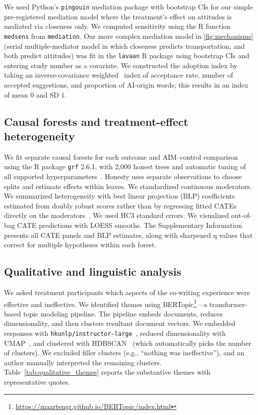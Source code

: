 \documentclass[11pt]{article}
\begin{document}
We used Python's \texttt{pingouin} mediation package with bootstrap CIs for our simple pre-registered mediation model where the treatment's effect on attitudes is mediated via closeness only. We computed sensitivity using the R function \texttt{medsens} from \texttt{mediation}. Our more complex mediation model in \autoref{fig:mechanisms} (serial multiple-mediator model in which closeness predicts transportation, and both predict attitudes) was fit in the \texttt{lavaan} R package using bootstrap CIs and entering study number as a covariate. We constructed the adoption index by taking an inverse-covariance weighted~\cite{anderson_multiple_2008} index of acceptance rate, number of accepted suggestions, and proportion of AI-origin words; this results in an index of mean 0 and SD 1.

\subsection{Causal forests and treatment-effect heterogeneity}
\label{sec:methods-causal-forests}
We fit separate causal forests for each outcome and AIM--control comparison using the R package \texttt{grf} 2.6.1, with 2,000 honest trees and automatic tuning of all supported hyperparameters~\citep{wager_estimation_2018,athey_estimating_2019}. Honesty uses separate observations to choose splits and estimate effects within leaves. We standardized continuous moderators.
We summarized heterogeneity with best linear projection (BLP) coefficients estimated from doubly robust scores rather than by regressing fitted CATEs directly on the moderators~\citep{semenova_debiased_2021,chernozhukov_doubledebiased_2018}. We used HC3 standard errors. We visualized out-of-bag CATE predictions with LOESS smooths. The Supplementary Information presents all CATE panels and BLP estimates, along with sharpened q values that correct for multiple hypotheses within each forest.


\subsection{Qualitative and linguistic analysis}
\label{sec:methods-qualitative-and-linguistic-analysis}

We asked treatment participants which aspects of the co-writing experience were effective and ineffective. We identified themes using BERTopic\footnote{\url{https://maartengr.github.io/BERTopic/index.html}}---a transformer-based topic modeling pipeline. The pipeline embeds documents, reduces dimensionality, and then clusters resultant document vectors. We embedded responses with \texttt{hkunlp/instructor-large}~\citep{su_one_2023}, reduced dimensionality with UMAP~\citep{mcinnes_umap_2020}, and clustered with HDBSCAN~\citep{mcinnes_hdbscan_2017} (which automatically picks the number of clusters). We excluded filler clusters (e.g., ``nothing was ineffective''), and an author manually interpreted the remaining clusters. Table~\ref{tab:qualitative_themes} reports the substantive themes with representative quotes.
\end{document}
